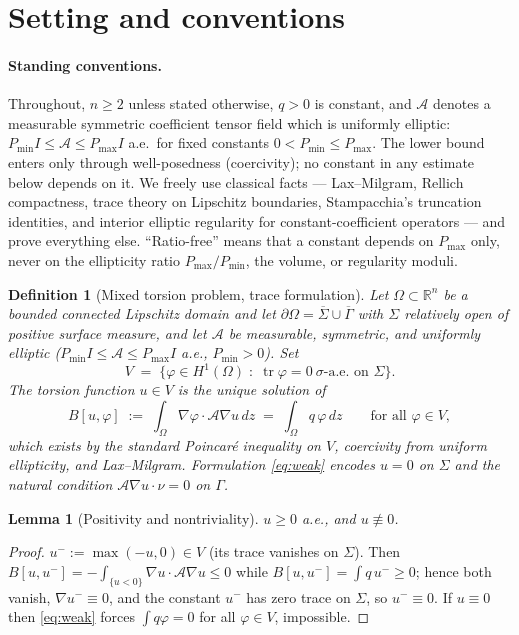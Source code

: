 \documentclass[10pt]{article}
\newtheorem{lemma}[theorem]{Lemma}
\newtheorem{definition}[theorem]{Definition}
\theoremstyle{remark}
\newcommand{\A}{\mathcal{A}}
\newcommand{\R}{\mathbb{R}}
\newcommand{\Om}{\Omega}
\newcommand{\Sig}{\Sigma}
\newcommand{\Gam}{\Gamma}
\newcommand{\Pmax}{P_{\max}}
\newcommand{\Pmin}{P_{\min}}
\begin{document}
\section{Setting and conventions}\label{sec:setting}

\paragraph{Standing conventions.}
Throughout, $n\ge 2$ unless stated otherwise, $q>0$ is constant, and $\A$
denotes a measurable symmetric coefficient tensor field which is uniformly
elliptic: $\Pmin I\le\A\le\Pmax I$ a.e.\ for fixed constants
$0<\Pmin\le\Pmax$. The lower bound enters only through well-posedness
(coercivity); no constant in any estimate below depends on it. We freely use classical facts --- Lax--Milgram, Rellich
compactness, trace theory on Lipschitz boundaries, Stampacchia's truncation
identities, and interior elliptic regularity for constant-coefficient
operators --- and prove everything else. ``Ratio-free'' means that a constant
depends on $\Pmax$ only, never on the ellipticity ratio $\Pmax/\Pmin$, the
volume, or regularity moduli.

\begin{definition}[Mixed torsion problem, trace formulation]\label{def:weak}
Let $\Om\subset\R^n$ be a bounded connected Lipschitz domain and let
$\partial\Om=\overline\Sig\cup\overline\Gam$ with $\Sig$ relatively open of
positive surface measure, and let $\A$ be measurable, symmetric, and uniformly
elliptic ($\Pmin I\le\A\le\Pmax I$ a.e., $\Pmin>0$). Set
\[
V \;=\; \{\varphi\in H^1(\Om)\;:\;\operatorname{tr}\varphi=0
\ \text{$\sigma$-a.e.\ on }\Sig\}.
\]
The \emph{torsion function} $u\in V$ is the unique solution of
\begin{equation}\label{eq:weak}
B[u,\varphi]\;:=\;\int_\Om \nabla\varphi\cdot\A\nabla u\,dz
\;=\;\int_\Om q\,\varphi\,dz\qquad\text{for all }\varphi\in V,
\end{equation}
which exists by the standard Poincar\'e inequality on $V$, coercivity from
uniform ellipticity, and Lax--Milgram.
Formulation \eqref{eq:weak} encodes $u=0$ on $\Sig$ and the natural condition
$\A\nabla u\cdot\nu=0$ on $\Gam$.
\end{definition}

\begin{lemma}[Positivity and nontriviality]\label{lem:pos}
$u\ge 0$ a.e., and $u\not\equiv 0$.
\end{lemma}

\begin{proof}
$u^-:=\max(-u,0)\in V$ (its trace vanishes on $\Sig$). Then
$B[u,u^-]=-\int_{\{u<0\}}\nabla u\cdot\A\nabla u\le 0$ while
$B[u,u^-]=\int q\,u^-\ge 0$; hence both vanish, $\nabla u^-\equiv 0$, and the
constant $u^-$ has zero trace on $\Sig$, so $u^-\equiv 0$. If $u\equiv 0$ then
\eqref{eq:weak} forces $\int q\varphi=0$ for all $\varphi\in V$, impossible.
\end{proof}
\end{document}
